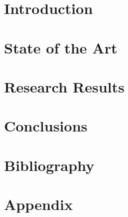 \documentclass[twoside,12pt,onecolumn,hyphens]{Latex/Classes/PhDthesisPSnPDF}
\begin{document}
\part{Introduction}
\label{sec:Part1}

%
\part{State of the Art}
\label{sec:Part2}

%
\part{Research Results}
\label{sec:Part3}

%
%
\part{Conclusions}
\label{sec:Part4}


\part{Bibliography}
\label{sec:bibliography}
%



\backmatter



\appendix
\part{Appendix}
\label{sec:appendix}


%
\end{document}

